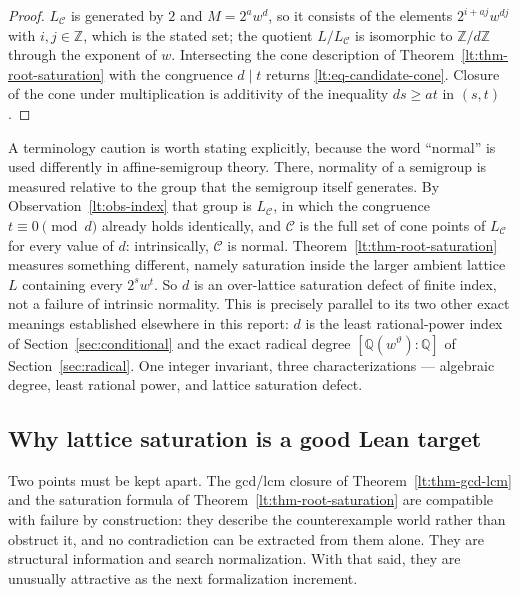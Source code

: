 \documentclass[11pt,oneside]{article}
\theoremstyle{definition}
\theoremstyle{remark}
\newcommand{\Z}{\mathbb Z}
\newcommand{\Q}{\mathbb Q}
\newcommand{\thetaq}{\vartheta}
\newcommand{\Cand}{\mathcal C}
\begin{document}
\begin{proof}
$L_{\Cand}$ is generated by $2$ and $M=2^aw^d$, so it consists of the elements
$2^{i+aj}w^{dj}$ with $i,j\in\Z$, which is the stated set; the quotient $L/L_{\Cand}$ is
isomorphic to $\Z/d\Z$ through the exponent of $w$.  Intersecting the cone description of
Theorem~\ref{lt:thm-root-saturation} with the congruence $d\mid t$ returns
\eqref{lt:eq-candidate-cone}.  Closure of the cone under multiplication is additivity of the
inequality $ds\ge at$ in $(s,t)$.
\end{proof}

A terminology caution is worth stating explicitly, because the word ``normal'' is used
differently in affine-semigroup theory.  There, normality of a semigroup is measured relative to
the group that the semigroup itself generates.  By Observation~\ref{lt:obs-index} that group is
$L_{\Cand}$, in which the congruence $t\equiv0\pmod d$ already holds identically, and $\Cand$ is
the full set of cone points of $L_{\Cand}$ for every value of $d$: intrinsically, $\Cand$ is
normal.  Theorem~\ref{lt:thm-root-saturation} measures something different, namely saturation
inside the larger ambient lattice $L$ containing every $2^sw^t$.  So $d$ is an over-lattice
saturation defect of finite index, not a failure of intrinsic normality.  This is precisely
parallel to its two other exact meanings established elsewhere in this report: $d$ is the least
rational-power index of Section~\ref{sec:conditional} and the exact radical degree
$[\Q(w^{\thetaq}):\Q]$ of Section~\ref{sec:radical}.  One integer invariant, three
characterizations --- algebraic degree, least rational power, and lattice saturation defect.

\subsection{Why lattice saturation is a good Lean target}

Two points must be kept apart.  The gcd/lcm closure of Theorem~\ref{lt:thm-gcd-lcm} and the
saturation formula of Theorem~\ref{lt:thm-root-saturation} are compatible with failure by
construction: they describe the counterexample world rather than obstruct it, and no
contradiction can be extracted from them alone.  They are structural information and search
normalization.  With that said, they are unusually attractive as the next formalization
increment.
\end{document}
